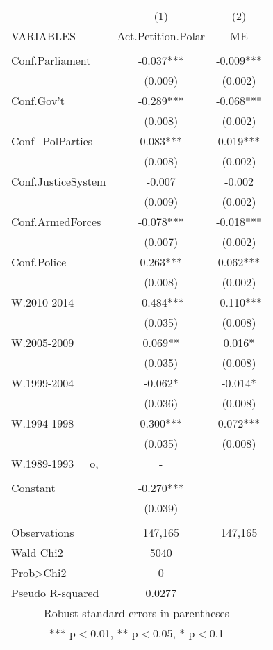 \documentclass[]{article}
\begin{document}
\begin{tabular}{lcc} \hline
 & (1) & (2) \\
VARIABLES & Act.Petition.Polar & ME \\ \hline
 &  &  \\
Conf.Parliament & -0.037*** & -0.009*** \\
 & (0.009) & (0.002) \\
Conf.Gov't & -0.289*** & -0.068*** \\
 & (0.008) & (0.002) \\
Conf\_PolParties & 0.083*** & 0.019*** \\
 & (0.008) & (0.002) \\
Conf.JusticeSystem & -0.007 & -0.002 \\
 & (0.009) & (0.002) \\
Conf.ArmedForces & -0.078*** & -0.018*** \\
 & (0.007) & (0.002) \\
Conf.Police & 0.263*** & 0.062*** \\
 & (0.008) & (0.002) \\
W.2010-2014 & -0.484*** & -0.110*** \\
 & (0.035) & (0.008) \\
W.2005-2009 & 0.069** & 0.016* \\
 & (0.035) & (0.008) \\
W.1999-2004 & -0.062* & -0.014* \\
 & (0.036) & (0.008) \\
W.1994-1998 & 0.300*** & 0.072*** \\
 & (0.035) & (0.008) \\
W.1989-1993 = o, & - &  \\
 &  &  \\
Constant & -0.270*** &  \\
 & (0.039) &  \\
 &  &  \\
Observations & 147,165 & 147,165 \\
Wald Chi2 & 5040 &  \\
Prob>Chi2 & 0 &  \\
 Pseudo R-squared & 0.0277 &  \\ \hline
\multicolumn{3}{c}{ Robust standard errors in parentheses} \\
\multicolumn{3}{c}{ *** p$<$0.01, ** p$<$0.05, * p$<$0.1} \\
\end{tabular}
\end{document}
